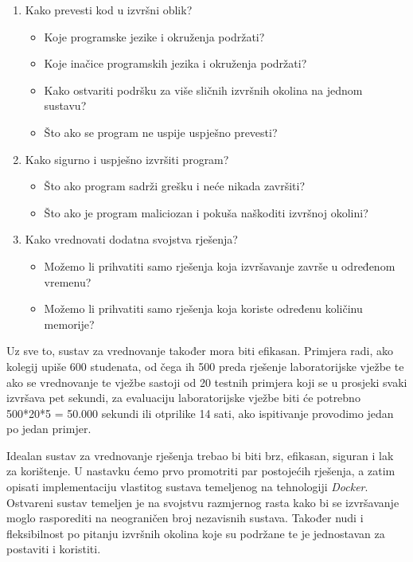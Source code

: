 \documentclass[times, utf8, zavrsni]{fer}
\begin{document}
\begin{enumerate}
\item Kako prevesti kod u izvršni oblik?
	\begin{itemize}
	\item Koje programske jezike i okruženja podržati?
	\item Koje inačice programskih jezika i okruženja podržati?
	\item Kako ostvariti podršku za više sličnih izvršnih okolina na jednom sustavu?
	\item Što ako se program ne uspije uspješno prevesti?
	\end{itemize}
\item Kako sigurno i uspješno izvršiti program?
	\begin{itemize}
	\item Što ako program sadrži grešku i neće nikada završiti?
	\item Što ako je program maliciozan i pokuša naškoditi izvršnoj okolini?
	\end{itemize}
\item Kako vrednovati dodatna svojstva rješenja?
	\begin{itemize}
	\item Možemo li prihvatiti samo rješenja koja izvršavanje završe u određenom vremenu?
	\item Možemo li prihvatiti samo rješenja koja koriste određenu količinu memorije?
	\end{itemize}
\end{enumerate}

Uz sve to, sustav za vrednovanje također mora biti efikasan. Primjera radi, ako kolegij upiše 600 studenata, od čega ih 500 preda rješenje laboratorijske vježbe te ako se vrednovanje te vježbe sastoji od 20 testnih primjera koji se u prosjeki svaki izvršava pet sekundi, za evaluaciju laboratorijske vježbe biti će potrebno 500*20*5 = 50.000 sekundi ili otprilike 14 sati, ako ispitivanje provodimo jedan po jedan primjer.

Idealan sustav za vrednovanje rješenja trebao bi biti brz, efikasan, siguran i lak za korištenje. U nastavku ćemo prvo promotriti par postojećih rješenja, a zatim opisati implementaciju vlastitog sustava temeljenog na tehnologiji {\textit{Docker}}. Ostvareni sustav temeljen je na svojstvu razmjernog rasta kako bi se izvršavanje moglo rasporediti na neograničen broj nezavisnih sustava. Također nudi i fleksibilnost po pitanju izvršnih okolina koje su podržane te je jednostavan za postaviti i koristiti.
\end{document}
